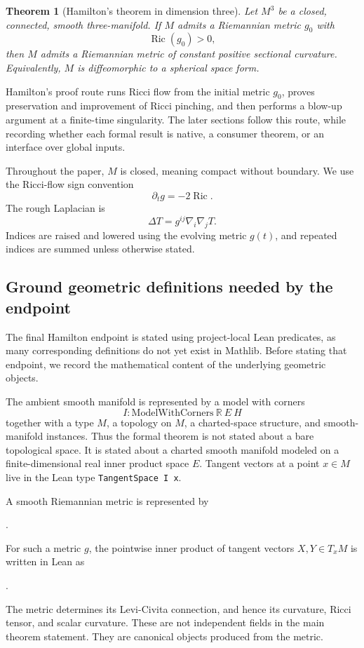 \documentclass[11pt]{article}
\theoremstyle{plain}
\newtheorem{theorem}{Theorem}[section]
\theoremstyle{definition}
\theoremstyle{remark}
\newcommand{\Ric}{\operatorname{Ric}}
\begin{document}
\begin{theorem}[Hamilton's theorem in dimension three]
\label{thm:main-hamilton-3d}
Let $M^3$ be a closed, connected, smooth three-manifold. If $M$ admits a
Riemannian metric $g_0$ with
\[
\Ric(g_0)>0,
\]
then $M$ admits a Riemannian metric of constant positive sectional curvature.
Equivalently, $M$ is diffeomorphic to a spherical space form.
\end{theorem}


Hamilton's proof route runs Ricci flow from the initial metric \(g_0\), proves
preservation and improvement of Ricci pinching, and then performs a blow-up
argument at a finite-time singularity.  The later sections follow this route,
while recording whether each formal result is native, a consumer theorem, or an
interface over global inputs.

Throughout the paper, $M$ is closed, meaning compact without boundary.  We use
the Ricci-flow sign convention
\[
  \partial_t g=-2\Ric.
\]
The rough Laplacian is
\[
  \Delta T=g^{ij}\nabla_i\nabla_jT.
\]
Indices are raised and lowered using the evolving metric $g(t)$, and repeated
indices are summed unless otherwise stated.

\subsection{Ground geometric definitions needed by the endpoint}
\label{subsec:ground-definitions-for-endpoint}

The final Hamilton endpoint is stated using project-local Lean predicates, as many corresponding definitions do not yet exist in Mathlib.
Before stating that endpoint, we record the mathematical content of the
underlying geometric objects.

The ambient smooth manifold is represented by a model with corners
\[
  I : \mathrm{ModelWithCorners}\ \mathbb{R}\ E\ H
\]
together with a type \(M\), a topology on \(M\), a charted-space structure, and
smooth-manifold instances.  Thus the formal theorem is not stated about a bare
topological space.  It is stated about a charted smooth manifold modeled on a
finite-dimensional real inner product space \(E\).  Tangent vectors at a point
\(x\in M\) live in the Lean type \texttt{TangentSpace I x}.

A smooth Riemannian metric is represented by
\begin{center}
\texttt{}.
\end{center}
For such a metric \(g\), the pointwise inner product of tangent vectors
\(X,Y\in T_xM\) is written in Lean as
\begin{center}
\texttt{}.
\end{center}
The metric determines its Levi-Civita connection, and hence its curvature,
Ricci tensor, and scalar curvature.  These are not independent fields in the
main theorem statement.  They are canonical objects produced from the metric.
\end{document}
